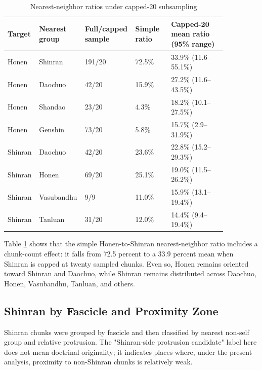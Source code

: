 \documentclass[uplatex,dvipdfmx,11pt,a4paper]{jsarticle}
\begin{document}
\begin{table}[H]
\centering
\footnotesize
\setlength{\tabcolsep}{2pt}
\caption{Nearest-neighbor ratios under capped-20 subsampling}
\label{tab:nearest-subsampling}
\begin{tabular}{@{}p{0.08\linewidth}p{0.17\linewidth}p{0.20\linewidth}p{0.16\linewidth}p{0.25\linewidth}@{}}
\toprule
Target & Nearest group & Full/capped sample & Simple ratio & Capped-20 mean ratio (95\% range) \\
\midrule
Honen & Shinran & 191/20 & 72.5\% & 33.9\% (11.6--55.1\%) \\
Honen & Daochuo & 42/20 & 15.9\% & 27.2\% (11.6--43.5\%) \\
Honen & Shandao & 23/20 & 4.3\% & 18.2\% (10.1--27.5\%) \\
Honen & Genshin & 73/20 & 5.8\% & 15.7\% (2.9--31.9\%) \\
Shinran & Daochuo & 42/20 & 23.6\% & 22.8\% (15.2--29.3\%) \\
Shinran & Honen & 69/20 & 25.1\% & 19.0\% (11.5--26.2\%) \\
Shinran & Vasubandhu & 9/9 & 11.0\% & 15.9\% (13.1--19.4\%) \\
Shinran & Tanluan & 31/20 & 12.0\% & 14.4\% (9.4--19.4\%) \\
\bottomrule
\end{tabular}
\end{table}

Table \ref{tab:nearest-subsampling} shows that the simple Honen-to-Shinran nearest-neighbor ratio includes a chunk-count effect: it falls from 72.5 percent to a 33.9 percent mean when Shinran is capped at twenty sampled chunks. Even so, Honen remains oriented toward Shinran and Daochuo, while Shinran remains distributed across Daochuo, Honen, Vasubandhu, Tanluan, and others.

\subsection{Shinran by Fascicle and Proximity Zone}

Shinran chunks were grouped by fascicle and then classified by nearest non-self group and relative protrusion. The "Shinran-side protrusion candidate" label here does not mean doctrinal originality; it indicates places where, under the present analysis, proximity to non-Shinran chunks is relatively weak.
\end{document}
